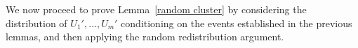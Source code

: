 \documentclass[11pt, letterpaper]{amsart}
\theoremstyle{plain}
\numberwithin{equation}{section}
\theoremstyle{definition}
\renewcommand{\vec}[1]{{\mathbf #1}}
\begin{document}


        We now proceed to prove Lemma~\ref{random cluster} by considering the distribution of \(U_1',\dots,U_m'\) conditioning on the events established in the previous lemmas, and then applying the random redistribution argument.
\end{document}
